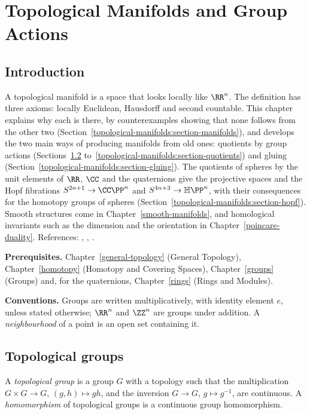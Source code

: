 \chapter{Topological Manifolds and Group Actions}\label{topological-manifolds}

\section{Introduction}\label{topological-manifolds:section-introduction}

A topological manifold is a space that looks locally like $\RR^n$. The definition has three axioms: locally Euclidean, Hausdorff and second countable. This chapter explains why each is there, by
counterexamples showing that none follows from the other two (Section~\ref{topological-manifolds:section-manifolds}), and develops the two main ways of producing manifolds from old ones: quotients by
group actions (Sections~\ref{topological-manifolds:section-groups} to~\ref{topological-manifolds:section-quotients}) and gluing (Section~\ref{topological-manifolds:section-gluing}). The quotients of spheres by the
unit elements of $\RR$, $\CC$ and the quaternions give the projective spaces and the Hopf fibrations $S^{2n+1} \to \CC\PP^n$ and $S^{4n+3} \to \mathbb{H}\PP^n$, with their consequences for the homotopy groups of
spheres (Section~\ref{topological-manifolds:section-hopf}). Smooth structures come in
Chapter~\ref{smooth-manifolds}, and homological invariants such as the dimension and the orientation in Chapter~\ref{poincare-duality}. References: \cite{munkres-topology}, \cite{hatcher-at},
\cite{lee-smooth-manifolds}.

\noindent\textbf{Prerequisites.} Chapter~\ref{general-topology} (General Topology), Chapter~\ref{homotopy} (Homotopy and Covering Spaces), Chapter~\ref{groups} (Groups) and, for the quaternions,
Chapter~\ref{rings} (Rings and Modules).

\noindent\textbf{Conventions.} Groups are written multiplicatively, with identity element $e$, unless stated otherwise; $\RR^n$ and $\ZZ^n$ are groups under addition. A \emph{neighbourhood} of a point is an open set
containing it.

\section{Topological groups}\label{topological-manifolds:section-groups}

\begin{definition}\label{topological-manifolds:definition-topological-group}
A \emph{topological group} is a group $G$ with a topology such that the multiplication $G \times G \to G$, $(g, h) \mapsto gh$, and the inversion $G \to G$, $g \mapsto g^{-1}$, are continuous. A \emph{homomorphism} of
topological groups is a continuous group homomorphism.
\end{definition}

